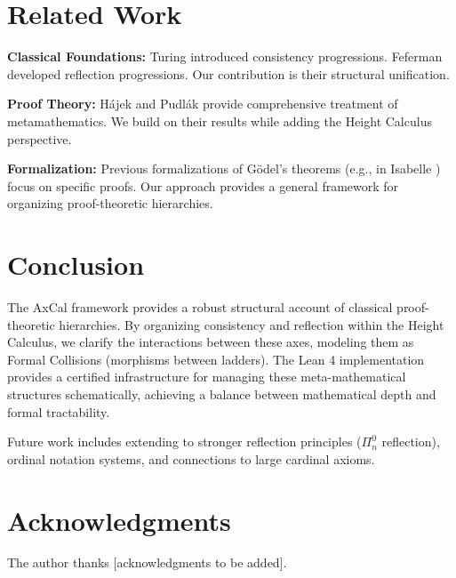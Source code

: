 \documentclass[11pt]{article}
\begin{document}
\section{Related Work}

\textbf{Classical Foundations:} Turing \cite{Turing1939} introduced consistency progressions. Feferman \cite{Feferman1962} developed reflection progressions. Our contribution is their structural unification.

\textbf{Proof Theory:} Hájek and Pudlák \cite{HajekPudlak} provide comprehensive treatment of metamathematics. We build on their results while adding the Height Calculus perspective.

\textbf{Formalization:} Previous formalizations of Gödel's theorems (e.g., in Isabelle \cite{Paulson}) focus on specific proofs. Our approach provides a general framework for organizing proof-theoretic hierarchies.

\section{Conclusion}
The AxCal framework provides a robust structural account of classical proof-theoretic hierarchies. By organizing consistency and reflection within the Height Calculus, we clarify the interactions between these axes, modeling them as Formal Collisions (morphisms between ladders). The Lean 4 implementation provides a certified infrastructure for managing these meta-mathematical structures schematically, achieving a balance between mathematical depth and formal tractability.

Future work includes extending to stronger reflection principles ($\Pi^0_n$ reflection), ordinal notation systems, and connections to large cardinal axioms.

\section*{Acknowledgments}

The author thanks [acknowledgments to be added].
\end{document}
